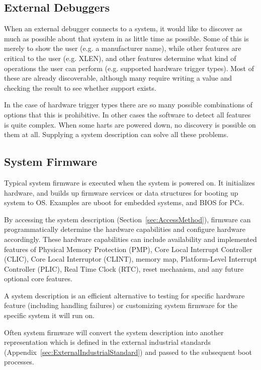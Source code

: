 \subsection{External Debuggers}

When an external debugger connects to a system, it would like to discover as
much as possible about that system in as little time as possible. Some of this
is merely to show the user (e.g. a manufacturer name), while other features are
critical to the user (e.g. XLEN), and other features determine what kind of
operations the user can perform (e.g. supported hardware trigger types). Most
of these are already discoverable, although many require writing a value and
checking the result to see whether support exists.

In the case of hardware trigger types there are so many possible combinations
of options that this is prohibitive. In other cases the software to detect all
features is quite complex. When some harts are powered down, no discovery is
possible on them at all. Supplying a system description can solve all these
problems.

\subsection{System Firmware}

Typical system firmware is executed when the system is powered on. It
initializes hardware, and builds up firmware services or data structures for
booting up system to OS. Examples are uboot for embedded systems, and BIOS for
PCs.

By accessing the system description (Section~\ref{sec:AccessMethod}), firmware
can programmatically determine the hardware capabilities and configure hardware
accordingly.  These hardware capabilities can include availability and
implemented features of Physical Memory Protection (PMP), Core Local Interrupt
Controller (CLIC), Core Local Interruptor (CLINT), memory map, Platform-Level
Interrupt Controller (PLIC), Real Time Clock (RTC), reset mechanism, and any
future optional core features.

A system description is an efficient alternative to testing for specific
hardware feature (including handling failures) or customizing system firmware
for the specific system it will run on.

Often system firmware will convert the system description into another
representation which is defined in the external industrial standards
(Appendix~\ref{sec:ExternalIndustrialStandard}) and passed to the subsequent
boot processes.

